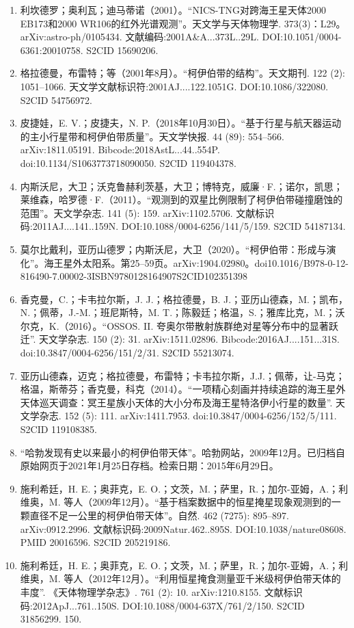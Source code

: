 \begin{enumerate}
\item 利坎德罗；奥利瓦；迪马蒂诺（2001）。“NICS-TNG对跨海王星天体2000 EB173和2000 WR106的红外光谱观测”。天文学与天体物理学. 373(3)：L29。arXiv:astro-ph/0105434. 文献编码:2001A&A...373L..29L. DOI:10.1051/0004-6361:20010758. S2CID 15690206.
\item 格拉德曼，布雷特；等（2001年8月）。“柯伊伯带的结构”。天文期刊. 122 (2): 1051–1066. 天文学文献标识符:2001AJ....122.1051G. DOI:10.1086/322080. S2CID 54756972.
\item 皮捷娃，E. V.；皮捷夫，N. P.（2018年10月30日）。“基于行星与航天器运动的主小行星带和柯伊伯带质量”。天文学快报. 44 (89): 554–566. arXiv:1811.05191. Bibcode:2018AstL...44..554P. doi:10.1134/S1063773718090050. S2CID 119404378.
\item 内斯沃尼，大卫；沃克鲁赫利茨基，大卫；博特克，威廉·F.；诺尔，凯思；莱维森，哈罗德·F.（2011）。“观测到的双星比例限制了柯伊伯带碰撞磨蚀的范围”。天文学杂志. 141 (5): 159. arXiv:1102.5706. 文献标识码:2011AJ....141..159N. DOI:10.1088/0004-6256/141/5/159. S2CID 54187134.
\item 莫尔比戴利，亚历山德罗；内斯沃尼，大卫（2020）。“柯伊伯带：形成与演化”。海王星外太阳系。第25–59页。arXiv:1904.02980。doi10.1016/B978-0-12-816490-7.00002-3ISBN9780128164907S2CID102351398
\item 香克曼，C.；卡韦拉尔斯，J. J.；格拉德曼，B. J.；亚历山德森，M.；凯布，N.；佩蒂，J.-M.；班尼斯特，M. T.；陈毅廷；格温，S.；雅库比克，M.；沃尔克，K.（2016）。“OSSOS. II. 夸奥尔带散射族群绝对星等分布中的显著跃迁”. 天文学杂志. 150 (2): 31. arXiv:1511.02896. Bibcode:2016AJ....151...31S. doi:10.3847/0004-6256/151/2/31. S2CID 55213074.
\item 亚历山德森，迈克；格拉德曼，布雷特；卡韦拉尔斯，J.J.；佩蒂，让-马克；格温，斯蒂芬；香克曼，科克（2014）。“一项精心刻画并持续追踪的海王星外天体巡天调查：冥王星族小天体的大小分布及海王星特洛伊小行星的数量”. 天文学杂志. 152 (5): 111. arXiv:1411.7953. doi:10.3847/0004-6256/152/5/111. S2CID 119108385.
\item “哈勃发现有史以来最小的柯伊伯带天体”。哈勃网站，2009年12月。已归档自原始网页于2021年1月25日存档。检索日期：2015年6月29日。
\item 施利希廷，H. E.；奥菲克，E. O.；文茨，M.；萨里，R.；加尔-亚姆，A.；利维奥，M. 等人（2009年12月）。“基于档案数据中的恒星掩星现象观测到的一颗直径不足一公里的柯伊伯带天体”。自然. 462 (7275): 895–897. arXiv:0912.2996. 文献标识码:2009Natur.462..895S. DOI:10.1038/nature08608. PMID 20016596. S2CID 205219186.
\item 施利希廷，H. E.；奥菲克，E. O.；文茨，M.；萨里，R.；加尔-亚姆，A.；利维奥，M. 等人（2012年12月）。“利用恒星掩食测量亚千米级柯伊伯带天体的丰度”. 《天体物理学杂志》. 761 (2): 10. arXiv:1210.8155. 文献标识码:2012ApJ...761..150S. DOI:10.1088/0004-637X/761/2/150. S2CID 31856299. 150.

\end{enumerate}
